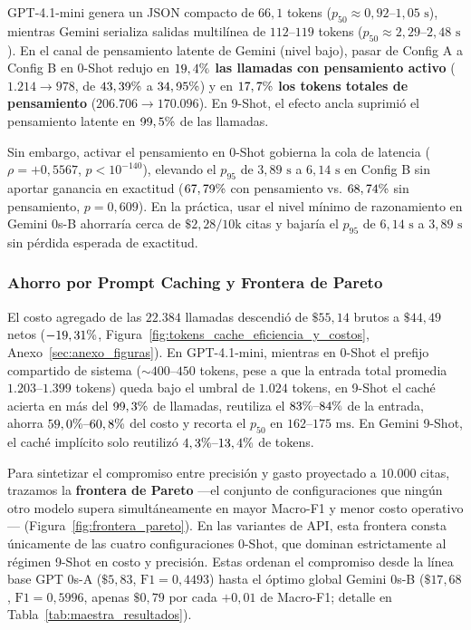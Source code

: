 \documentclass[conference]{IEEEtran}
\newcommand{\pct}{\mbox{\symbol{37}}}
\begin{document}
GPT-4.1-mini genera un JSON compacto de $66,1$ tokens ($p_{50} \approx 0,92\text{--}1,05\text{ s}$), mientras Gemini serializa salidas multilínea de $112\text{--}119$ tokens ($p_{50} \approx 2,29\text{--}2,48\text{ s}$). En el canal de pensamiento latente de Gemini (nivel bajo), pasar de Config A a Config B en 0-Shot redujo en \textbf{$19,4\pct{}$ las llamadas con pensamiento activo} ($1.214 \to 978$, de $43,39\pct{}$ a $34,95\pct{}$) y en \textbf{$17,7\pct{}$ los tokens totales de pensamiento} ($206.706 \to 170.096$). En 9-Shot, el efecto ancla suprimió el pensamiento latente en $99,5\pct{}$ de las llamadas.

Sin embargo, activar el pensamiento en 0-Shot gobierna la cola de latencia ($\rho = +0,5567$, $p < 10^{-140}$), elevando el $p_{95}$ de $3,89\text{ s}$ a $6,14\text{ s}$ en Config B sin aportar ganancia en exactitud ($67,79\pct{}$ con pensamiento vs. $68,74\pct{}$ sin pensamiento, $p = 0,609$). En la práctica, usar el nivel mínimo de razonamiento en Gemini 0s-B ahorraría cerca de $\$2,28/10\text{k}$ citas y bajaría el $p_{95}$ de $6,14\text{ s}$ a $3,89\text{ s}$ sin pérdida esperada de exactitud.

\subsubsection{Ahorro por Prompt Caching y Frontera de Pareto}

El costo agregado de las $22.384$ llamadas descendió de $\$55,14$ brutos a $\$44,49$ netos ($-19,31\pct{}$, Figura~\ref{fig:tokens_cache_eficiencia_y_costos}, Anexo~\ref{sec:anexo_figuras}). En GPT-4.1-mini, mientras en 0-Shot el prefijo compartido de sistema ($\sim 400\text{--}450$ tokens, pese a que la entrada total promedia $1.203\text{--}1.399$ tokens) queda bajo el umbral de $1.024$ tokens, en 9-Shot el caché acierta en más del $99,3\pct{}$ de llamadas, reutiliza el $83\pct{}\text{--}84\pct{}$ de la entrada, ahorra $59,0\pct{}\text{--}60,8\pct{}$ del costo y recorta el $p_{50}$ en $162\text{--}175\text{ ms}$. En Gemini 9-Shot, el caché implícito solo reutilizó $4,3\pct{}\text{--}13,4\pct{}$ de tokens.

Para sintetizar el compromiso entre precisión y gasto proyectado a $10.000$ citas, trazamos la \textbf{frontera de Pareto} ---el conjunto de configuraciones que ningún otro modelo supera simultáneamente en mayor Macro-F1 y menor costo operativo--- (Figura~\ref{fig:frontera_pareto}). En las variantes de API, esta frontera consta únicamente de las cuatro configuraciones 0-Shot, que dominan estrictamente al régimen 9-Shot en costo y precisión. Estas ordenan el compromiso desde la línea base GPT 0s-A ($\$5,83$, $\text{F1}=0,4493$) hasta el óptimo global Gemini 0s-B ($\$17,68$, $\text{F1}=0,5996$, apenas $\$0,79$ por cada $+0,01$ de Macro-F1; detalle en Tabla~\ref{tab:maestra_resultados}).
\end{document}
